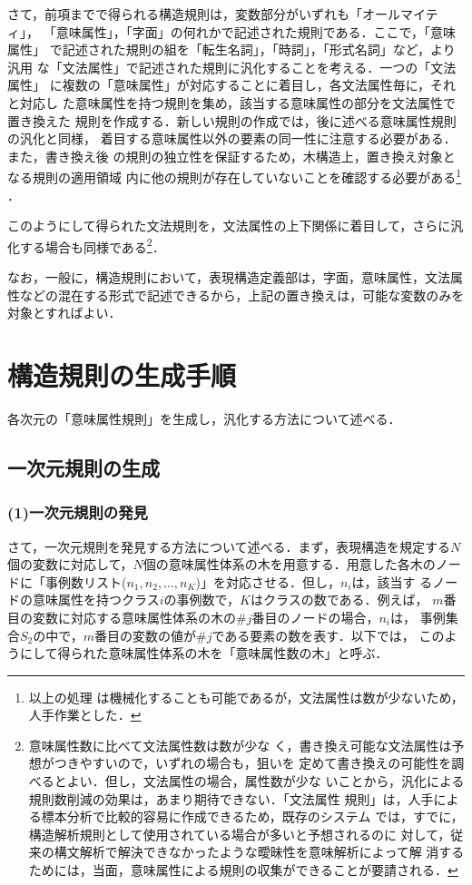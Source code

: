 さて，前項までで得られる構造規則は，変数部分がいずれも「オールマイティ」，
「意味属性」，「字面」の何れかで記述された規則である．ここで，「意味属性」
で記述された規則の組を「転生名詞」，「時詞」，「形式名詞」など，より汎用
な「文法属性」で記述された規則に汎化することを考える．一つの「文法属性」
に複数の「意味属性」が対応することに着目し，各文法属性毎に，それと対応し
た意味属性を持つ規則を集め，該当する意味属性の部分を文法属性で置き換えた
規則を作成する．新しい規則の作成では，後に述べる意味属性規則の汎化と同様，
着目する意味属性以外の要素の同一性に注意する必要がある．また，書き換え後
の規則の独立性を保証するため，木構造上，置き換え対象となる規則の適用領域
内に他の規則が存在していないことを確認する必要がある\footnote{以上の処理
は機械化することも可能であるが，文法属性は数が少ないため，人手作業とした．}
．

このようにして得られた文法規則を，文法属性の上下関係に着目して，さらに汎
化する場合も同様である\footnote{意味属性数に比べて文法属性数は数が少な
く，書き換え可能な文法属性は予想がつきやすいので，いずれの場合も，狙いを
定めて書き換えの可能性を調べるとよい．但し，文法属性の場合，属性数が少な
いことから，汎化による規則数削減の効果は，あまり期待できない．「文法属性
規則」は，人手による標本分析で比較的容易に作成できるため，既存のシステム
では，すでに，構造解析規則として使用されている場合が多いと予想されるのに
対して，従来の構文解析で解決できなかったような曖昧性を意味解析によって解
消するためには，当面，意味属性による規則の収集ができることが要請される．}．

なお，一般に，構造規則において，表現構造定義部は，字面，意味属性，文法属
性などの混在する形式で記述できるから，上記の置き換えは，可能な変数のみを
対象とすればよい．
\section{構造規則の生成手順}
各次元の「意味属性規則」を生成し，汎化する方法について述べる．
\subsection{一次元規則の生成}
\subsubsection*{(1)一次元規則の発見}
さて，一次元規則を発見する方法について述べる．まず，表現構造を規定する$N$
個の変数に対応して，$N$個の意味属性体系の木を用意する．用意した各木のノー
ドに「事例数リスト(${n_1,n_2,\dots,n_K}$)」を対応させる．但し，${n_i}$は，該当す
るノードの意味属性を持つクラス$i$の事例数で，$K$はクラスの数である．例えば，
$m$番目の変数に対応する意味属性体系の木の$\#j$番目のノードの場合，${n_i}$は，
事例集合${S_2}$の中で，$m$番目の変数の値が$\#j$である要素の数を表す．以下では，
このようにして得られた意味属性体系の木を「意味属性数の木」と呼ぶ．

